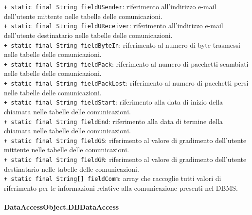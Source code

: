 {\begin{sloppypar}
{{{{\begin{itemize}
{					\texttt{+ static final String fieldUSender}: riferimento all'indirizzo e-mail dell'utente mittente nelle tabelle delle comunicazioni.\\
					
					\texttt{+ static final String fieldUReceiver}: riferimento all'indirizzo e-mail dell'utente destinatario nelle tabelle delle comunicazioni.\\
					
					\texttt{+ static final String fieldByteIn}: riferimento al numero di byte trasmessi nelle tabelle delle comunicazioni.\\
					
					\texttt{+ static final String fieldPack}: riferimento al numero di pacchetti scambiati nelle tabelle delle comunicazioni.\\
					
					\texttt{+ static final String fieldPackLost}: riferimento al numero di pacchetti persi nelle tabelle delle comunicazioni.\\
					
					\texttt{+ static final String fieldStart}: riferimento alla data di inizio della chiamata nelle tabelle delle comunicazioni.\\
					
					\texttt{+ static final String fieldEnd}: riferimento alla data di termine della chiamata nelle tabelle delle comunicazioni.\\
					
					\texttt{+ static final String fieldGS}: riferimento al valore di gradimento dell'utente mittente nelle tabelle delle comunicazioni.\\
					
					\texttt{+ static final String fieldGR}: riferimento al valore di gradimento dell'utente destinatario nelle tabelle delle comunicazioni.\\
					
					\texttt{+ static final String[] fieldComm}: array che raccoglie tutti valori di riferimento per le informazioni relative alla comunicazione presenti nel DBMS\g.\\
				}
			\end{itemize}
		}%
		
		
		\paragraph{DataAccessObject.DBDataAccess}\label{par:DataAccessObjectDBDataAccess}{
			\begin{itemize}
			

\end{itemize}}}}}
\end{sloppypar}}
